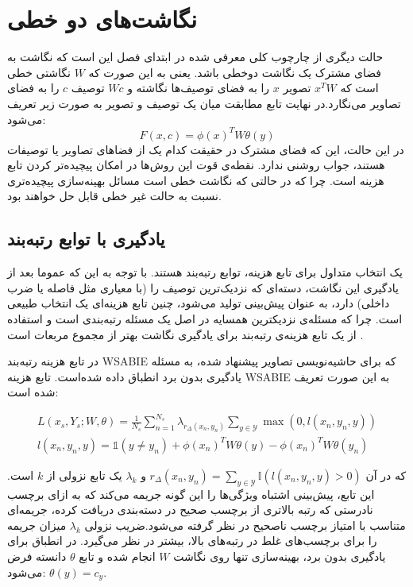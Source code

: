 \section{نگاشت‌های دو خطی}
حالت دیگری از چارچوب کلی معرفی شده در ابتدای فصل این است که نگاشت به فضای مشترک یک نگاشت دوخطی باشد. یعنی به این صورت که $W$ نگاشتی خطی است که $x^TW$ تصویر $x$ را به فضای توصیف‌ها نگاشته و $Wc$ توصیف $c$ را به فضای تصاویر می‌نگارد.در نهایت تابع مطابقت میان یک توصیف و تصویر به صورت زیر تعریف می‌شود:
\begin{equation}\label{bilinear}
F(x,c) = \phi(x)^TW \theta(y)
\end{equation}
 در این حالت، این که فضای مشترک در حقیقت کدام یک از فضاهای تصاویر یا توصیفات هستند، جواب روشنی ندارد. نقطه‌ی قوت این روش‌ها در امکان پیچیده‌تر کردن تابع هزینه است. چرا که در حالتی که نگاشت خطی است مسائل بهینه‌سازی پیچیده‌تری نسبت به حالت غیر خطی قابل حل خواهند بود.

 \subsection{یادگیری با توابع رتبه‌بند}
  یک انتخاب متداول برای تابع هزینه، توابع رتبه‌بند
هستند. با توجه به این که عموما بعد از یادگیری این نگاشت، دسته‌ای که نزدیک‌ترین توصیف را (با معیاری مثل فاصله یا ضرب داخلی) دارد، به عنوان پیش‌بینی تولید می‌شود،
 چنین تابع هزینه‌ای یک انتخاب طبیعی است. چرا که مسئله‌ی نزدیکترین همسایه در اصل یک مسئله رتبه‌بندی
 است و استفاده از یک تابع هزینه‌ی رتبه‌بند برای یادگیری نگاشت بهتر از مجموع مربعات است \cite{devise}.

در
\cite{akata2013}
 تابع هزینه رتبه‌بند WSABIE
\cite{wsabie}
که برای حاشیه‌نویسی تصاویر پیشنهاد شده، به مسئله یادگیری بدون برد انطباق داده شده‌است.
تابع هزینه WSABIE به این صورت تعریف شده است:

\begin{align}
L(x_s, Y_s ; W, \theta) = \frac{1}{N_s} \sum_{n=1}^{N_s} \lambda_{r_\Delta (x_n, y_n)} \sum_{y \in \mathcal{Y}} \max (0, \mathit{l}(x_n, y_n, y) ) \\
\mathit{l}(x_n,y_n,y) = \mathds{1}(y \neq y_n) + \phi(x_n)^TW \theta(y) - \phi(x_n)^TW\theta(y_n) \label{l_loss}
\end{align}

که در آن
$ r_\Delta (x_n, y_n) =  \sum_{y \in \mathcal{Y}} \mathbb{I}(\mathit{l}(x_n, y_n, y)  > 0) $
 و $\lambda_k$ یک تابع نزولی از $k$ است. این تابع، پیش‌بینی اشتباه ویژگی‌ها را  این گونه جریمه می‌کند که به ازای برچسب نادرستی که رتبه بالاتری از برچسب صحیح در دسته‌بندی دریافت کرده، جریمه‌ای متناسب با امتیاز برچسب ناصحیح در نظر گرفته می‌شود.ضریب نزولی $\lambda_k$ میزان جریمه را برای برچسب‌های غلط در رتبه‌های بالا، بیشتر در نظر می‌گیرد. در انطباق برای یادگیری بدون برد، بهینه‌سازی تنها روی نگاشت $W$ انجام شده و  تابع $\theta$ دانسته فرض می‌شود:
$\theta(y) = c_y$.


